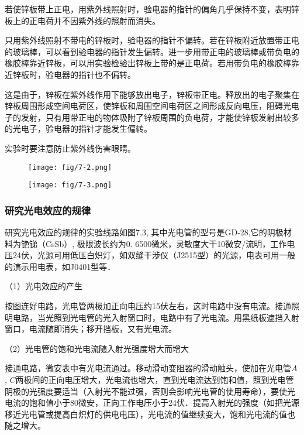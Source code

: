 若使锌板带上正电，用紫外线照射时，验电器的指针的偏角几乎保持不变，表明锌板上的正电荷并不因紫外线的照射而消失。

只用紫外线照射不带电的锌板时，验电器的指针不偏转。若在锌板附近放置带正电的玻璃棒，可以看到验电器的指针发生偏转。进一步用带正电的玻璃棒或带负电的橡胶棒靠近锌板，可以用实验检验出锌板上带的是正电荷。若用带负电的橡胶棒靠近锌板时，验电器的指针也不偏转。

这是由于，锌板在紫外线作用下能够放出电子，锌板带正电。释放出的电子聚集在锌板周围形成空间电荷区，使锌板和周围空间电荷区之间形成反向电压，阻碍光电子的发射，只有用带正电的物体吸附了锌板周围的负电荷，才能使锌板发射出较多的光电子，验电器的指针才能发生偏转。

实验时要注意防止紫外线伤害眼睛。

\begin{figure}[htp]\centering
    \begin{minipage}[t]{0.48\textwidth}
    \centering
    \texttt{[image: fig/7-2.png]}
    \caption{}
    \end{minipage}
    \begin{minipage}[t]{0.48\textwidth}
    \centering
    \texttt{[image: fig/7-3.png]}
    \caption{}
    \end{minipage}
    \end{figure}

\subsubsection{研究光电效应的规律}

研究光电效应的规律的实验线路如图7.3, 其中光电管的型号是GD-28,它的阴极材料为铯锑（CsSb）, 极限波长约为0. 6500微米，灵敏度大干10微安/流明，工作电压24伏，光源可用低压白炽灯，如双缝干涉仪（J2515型）的光源，电表可用一般的演示用电表，如J0401型等．


（1）光电效应的产生

按图连好电路，光电管两极加正向电压约15伏左右，这时电路中没有电流。接通照明电路，当光照到光电管的光入射窗口时，电路中有了光电流。用黑纸板遮挡入射窗口，电流随即消失；移开挡板，又有光电流。

（2）光电管的饱和光电流随入射光强度增大而增大

接通电路，微安表中有光电流通过。移动滑动变阻器的滑动触头，使加在光电管$A$, $C$两极间的正向电压增大，光电流也增大，直到光电流达到饱和值，照到光电管阴极的光强度要适当（入射光不能过强，否则会影响光电管的使用寿命），要使光电流的饱和值小于80微安，正向工作电压小于24伏．提高入射光的强度（如把光源移近光电管或提高白炽灯的供电电压），光电流的值继续变大，饱和光电流的值也随之增大。

